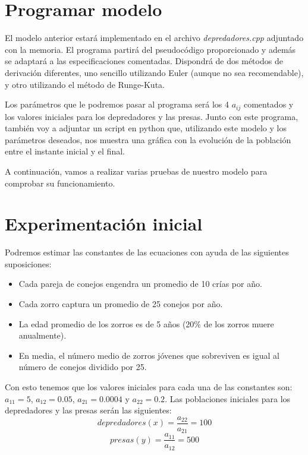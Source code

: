 \documentclass[11pt,a4paper]{article}
\begin{document}
\section{Programar modelo}
El modelo anterior estará implementado en el archivo \textit{depredadores.cpp} adjuntado con la memoria. El programa partirá del pseudocódigo
proporcionado y además se adaptará a las especificaciones comentadas. Dispondrá de dos métodos de derivación diferentes, uno sencillo utilizando
Euler (aunque no sea recomendable), y otro utilizando el método de Runge-Kuta.

Los parámetros que le podremos pasar al programa será los 4 $a_{ij}$ comentados y los valores iniciales para los depredadores y las presas.
Junto con este programa, también voy a adjuntar un script en python que, utilizando este modelo y los parámetros deseados, nos muestra una
gráfica con la evolución de la población entre el instante inicial y el final.

A continuación, vamos a realizar varias pruebas de nuestro modelo para comprobar su funcionamiento.


\newpage
\section{Experimentación inicial}

Podremos estimar las constantes de las ecuaciones con ayuda de las siguientes suposiciones:
\begin{itemize}
	\item Cada pareja de conejos engendra un promedio de 10 crías por año.
	\item Cada zorro captura un promedio de 25 conejos por año.
	\item La edad promedio de los zorros es de 5 años (20\% de los zorros muere anualmente).
	\item En media, el número medio de zorros jóvenes que sobreviven es igual al número de conejos dividido por 25.
\end{itemize}

Con esto tenemos que los valores iniciales para cada una de las constantes son: $a_{11}=5$, $a_{12}=0.05$, $a_{21}=0.0004$ y $a_{22}=0.2$.
Las poblaciones iniciales para los depredadores y las presas serán las siguientes:
$$depredadores(x) = \frac{a_{22}}{a_{21}} = 100$$
$$presas(y) = \frac{a_{11}}{a_{12}} = 500$$
\end{document}
